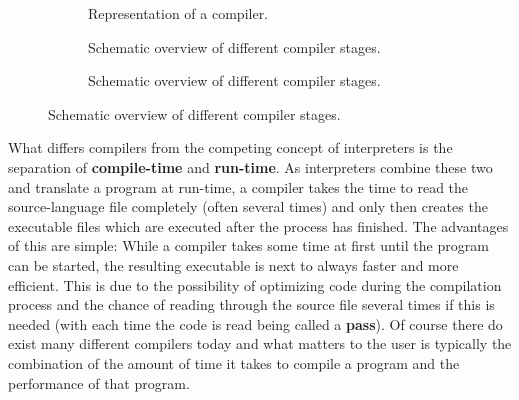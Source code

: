 \begin{figure}[htpb]
    \begin{subfigure}[c]{0.25\textwidth}
        
        \caption{\label{fig:compiler} Representation of a compiler.}
    \end{subfigure}
    \begin{subfigure}[c]{0.3\textwidth}
        
        \caption{\label{fig:cmpstruct} Schematic overview of different compiler stages.}
    \end{subfigure}
    \begin{subfigure}[c]{0.4\textwidth}
        
        \caption{\label{fig:cmpintstruct} Schematic overview of different compiler stages.}
    \end{subfigure}
\end{figure}

What differs compilers from the competing concept of interpreters is the separation of \textbf{compile-time} and \textbf{run-time}.
As interpreters combine these two and translate a program at run-time, a compiler takes the time to read the source-language file completely (often several times) and only then creates the executable files which are executed after the process has finished.
The advantages of this are simple:
While a compiler takes some time at first until the program can be started, the resulting executable is next to always faster and more efficient.
This is due to the possibility of optimizing code during the compilation process and the chance of reading through the source file several times if this is needed (with each time the code is read being called a \textbf{pass}).
Of course there do exist many different compilers today and what matters to the user is typically the combination of the amount of time it takes to compile a program and the performance of that program.


